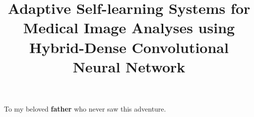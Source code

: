 \documentclass[numbers=noenddot, headsepline, footsepline,headings=small,
listof=totoc,listof=nochaptergap,listof=flat,index=totoc]{ucpThesis}
\title{Adaptive Self-learning Systems for Medical Image Analyses using Hybrid-Dense Convolutional Neural Network}
\begin{document}
\cleardoublepage
{}	
\begin{abstract}
	\lipsum[1]
\end{abstract}
\begin{dedication}
	\begin{doublespace}	
		\begin{center}
			To my beloved \textbf{father} who never saw this adventure.
		\end{center} 
	\end{doublespace}
\end{dedication}
{}
\begin{acknowledgements} 
	\begin{doublespace}	
			\lipsum[2]
			\lipsum[1]
	\end{doublespace}
\end{acknowledgements}
\begin{declaration} 
\end{declaration}
\begin{plagiarism} 
\end{plagiarism}
\begin{Research Completion} 
\end{Research Completion}
\begin{Certificate Of Examiners}
\end{Certificate Of Examiners}

\clearpage
\renewcommand{\cfttoctitlefont}{\hspace*{\fill}\Huge\bfseries}
\renewcommand{\cftaftertoctitle}{\hspace*{\fill}}
\renewcommand{\cftlottitlefont}{\hspace*{\fill}\Huge\bfseries}
\renewcommand{\cftafterlottitle}{\hspace*{\fill}}
\renewcommand{\cftloftitlefont}{\hspace*{\fill}\Huge\bfseries}
\renewcommand{\cftafterloftitle}{\hspace*{\fill}}

\end{document}
